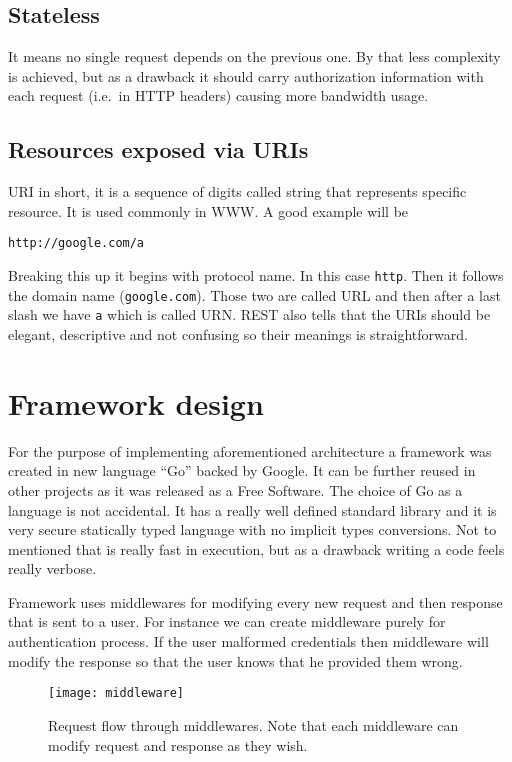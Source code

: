\subsection{Stateless}
\label{sec:stateless}
It means no single request depends on the previous one. By that less complexity
is achieved, but as a drawback it should carry authorization information with
each request (i.e.\ in HTTP headers) causing more bandwidth usage.

\subsection{Resources exposed via URIs}
\label{sec:resources}
URI\cite{URI-wiki} in short, it is a sequence of digits called string that
represents specific resource. It is used commonly in WWW\@. A good example will
be
\begin{verbatim}
http://google.com/a
\end{verbatim}
Breaking this up it begins with protocol name. In this case \verb|http|. Then
it follows the domain name (\verb|google.com|). Those two are called URL and
then after a last slash we have \verb|a| which is called URN\@. REST also tells
that the URIs should be elegant, descriptive and not confusing so their
meanings is straightforward.

\section{Framework design}
For the purpose of implementing aforementioned architecture a framework was
created in new language ``Go'' backed by Google\cite{Go-wiki}. It can be
further reused in other projects as it was released as a Free Software. The
choice of Go as a language is not accidental. It has a really well defined
standard library and it is very secure statically typed language with no
implicit types conversions. Not to mentioned that is really fast in execution,
but as a drawback writing a code feels really verbose.

Framework uses middlewares for modifying every new request and then response
that is sent to a user. For instance we can create middleware purely for
authentication process. If the user malformed credentials then middleware will
modify the response so that the user knows that he provided them wrong.

\begin{figure}[!htbp]
\centering
\texttt{[image: middleware]}
\caption[Request flow through middlewares]{Request flow through middlewares.
Note that each middleware can modify request and response as they wish.}
\label{fig:middleware}
\end{figure}


